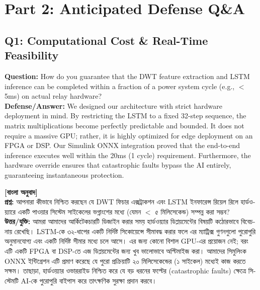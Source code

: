 \documentclass[12pt]{article}
\begin{document}
\newpage
\section*{Part 2: Anticipated Defense Q\&A}

\subsection*{Q1: Computational Cost \& Real-Time Feasibility}
\textbf{Question:} How do you guarantee that the DWT feature extraction and LSTM inference can be completed within a fraction of a power system cycle (e.g., $<$ 5ms) on actual relay hardware? \\
\textbf{Defense/Answer:} We designed our architecture with strict hardware deployment in mind. By restricting the LSTM to a fixed 32-step sequence, the matrix multiplications become perfectly predictable and bounded. It does not require a massive GPU; rather, it is highly optimized for edge deployment on an FPGA or DSP. Our Simulink ONNX integration proved that the end-to-end inference executes well within the 20ms (1 cycle) requirement. Furthermore, the hardware override ensures that catastrophic faults bypass the AI entirely, guaranteeing instantaneous protection.

\begin{bengali}
\textbf{[বাংলা অনুবাদ]} \\
\textbf{প্রশ্ন:} আপনারা কীভাবে নিশ্চিত করছেন যে DWT ফিচার এক্সট্রাকশন এবং LSTM ইনফারেন্স রিয়েল রিলে হার্ডওয়্যারে একটি পাওয়ার সিস্টেম সাইকেলের ভগ্নাংশের মধ্যে (যেমন $<$ ৫ মিলিসেকেন্ড) সম্পন্ন করা সম্ভব? \\
\textbf{উত্তর/যুক্তি:} আমরা আমাদের আর্কিটেকচারটি ডিজাইন করার সময় হার্ডওয়্যার ডিপ্লয়মেন্টের বিষয়টি কঠোরভাবে বিবেচনায় রেখেছি। LSTM-কে ৩২-ধাপের একটি নির্দিষ্ট সিকোয়েন্সে সীমাবদ্ধ করার ফলে এর ম্যাট্রিক্স গুণনগুলো পুরোপুরি অনুমানযোগ্য এবং একটি নির্দিষ্ট সীমার মধ্যে চলে আসে। এর জন্য কোনো বিশাল GPU-এর প্রয়োজন নেই; বরং এটি একটি FPGA বা DSP-তে এজ ডিপ্লয়মেন্টের জন্য খুব ভালোভাবে অপ্টিমাইজ করা। আমাদের সিমুলিংক ONNX ইন্টিগ্রেশন এটি প্রমাণ করেছে যে পুরো প্রক্রিয়াটি ২০ মিলিসেকেন্ডের (১ সাইকেল) মধ্যেই কাজ করতে সক্ষম। তাছাড়া, হার্ডওয়্যার ওভাররাইড নিশ্চিত করে যে বড় ধরনের ফল্টের (catastrophic faults) ক্ষেত্রে সিস্টেমটি AI-কে পুরোপুরি বাইপাস করে তাৎক্ষণিক সুরক্ষা প্রদান করবে।
\end{bengali}
\end{document}
